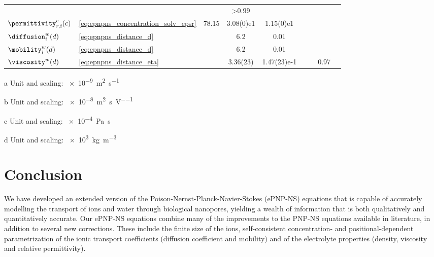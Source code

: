 \begin{landscape}
\begin{threeparttable}[p]
\begin{tabularx}{18cm}{@{}
            l l S[table-format=1.3] S[table-format=-1.2(2)e-1] S[table-format=-1.2(2)e-1]
            S[table-format=-1.2(2)e-1] S[table-format=-1.2(2)e-1] S[table-format=>1.2] l @{}}
      & & & >0.99 & \cite{Hai-Lang-1996} \\
      $\permittivity_{r,\text{f}}^c(c)$ & \cref{eq:epnpns_concentration_solv_epsr} & 78.15 & 3.08(0)e1 &
      1.15(0)e1 & & & & \cite{Buchner-1999,Gavish-2016} \\
      $\diffusion_{i}^w(d)$ & \cref{eq:epnpns_distance_d} & & 6.2 & 0.01 & & & &
      \cite{Makarov-1998,Simakov-2010,Pederson-2015} \\
      $\mobility_{i}^w(d)$ & \cref{eq:epnpns_distance_d} & & 6.2 & 0.01 & & & &
      \cite{Makarov-1998,Simakov-2010,Pederson-2015} \\
      $\viscosity^w(d)$ & \cref{eq:epnpns_distance_eta} & & 3.36(23) & 1.47(23)e-1 & & & 0.97 &
      \cite{Pronk-2014} \\
      \bottomrule
    \end{tabularx}
    \begin{tablenotes}
      \item[a] Unit and scaling: \SI{e-9}{\square\meter\per\second}
      \item[b] Unit and scaling: \SI{e-8}{\square\meter\per\second\per\volt}
      \item[c] Unit and scaling: \SI{e-4}{\pascal\second}
      \item[d] Unit and scaling: \SI{e3}{\kilo\gram\per\cubic\meter}
    \end{tablenotes}
  \end{threeparttable}
\end{landscape}
%


\section{Conclusion}
%
\label{sec:epnp-ns:conclusion}
%

We have developed an extended version of the Poison-Nernst-Planck-Navier-Stokes (ePNP-NS) equations that is
capable of accurately modelling the transport of ions and water through biological nanopores, yielding a
wealth of information that is both qualitatively and quantitatively accurate. Our {ePNP-NS} equations combine
many of the improvements to the PNP-NS equations available in literature, in addition to several new
corrections. These include the finite size of the ions, self-consistent concentration- and
positional-dependent parametrization of the ionic transport coefficients (diffusion coefficient and mobility)
and of the electrolyte properties (density, viscosity and relative permittivity).


\cleardoublepage

